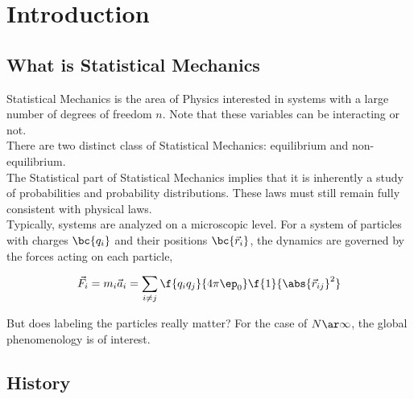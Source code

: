 \documentclass{article}
\begin{document}
\titlePage

\tableOfContents

\disclaimer

\section{Introduction}

\subsection{What is Statistical Mechanics}

Statistical Mechanics is the area of Physics interested in systems with a large number of degrees of freedom $n$. Note that these variables can be interacting or not. \\

There are two distinct class of Statistical Mechanics: equilibrium and non-equilibrium. \\

The Statistical part of Statistical Mechanics implies that it is inherently a study of probabilities and probability distributions. These laws must still remain fully consistent with physical laws. \\

Typically, systems are analyzed on a microscopic level. For a system of particles with charges $\bc{q_i}$ and their positions $\bc{\vec{r}_i}$, the dynamics are governed by the forces acting on each particle,

\[ \vec{F}_i = m_i \vec{a}_i = \sum_{i\neq j} \f{q_iq_j}{4\pi\ep_0} \f{1}{\abs{\vec{r}_{ij}}^2} \]

But does labeling the particles really matter? For the case of $N \ar \infty$, the global phenomenology is of interest.

\subsection{History}
\end{document}
